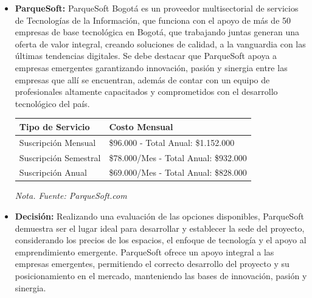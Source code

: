 \begin{itemize}
    \item \textbf{ParqueSoft:} ParqueSoft Bogotá es un proveedor multisectorial de servicios de Tecnologías de la Información, que funciona con el apoyo de más de 50 empresas de base tecnológica en Bogotá, que trabajando juntas generan una oferta de valor integral, creando soluciones de calidad, a la vanguardia con las últimas tendencias digitales. Se debe destacar que ParqueSoft apoya a empresas emergentes garantizando innovación, pasión y sinergia entre las empresas que allí se encuentran, además de contar con un equipo de profesionales altamente capacitados y comprometidos con el desarrollo tecnológico del país.

\begin{adjustbox}{center, caption={Precios de Espacios en ParqueSoft}, label={ParqueSoftPrecios}, nofloat=table, vspace={20px}}
    \begin{threeparttable}
        \centering
        \begin{tabular}{|p{7cm}|p{8cm}|}
            \hline
            \cellcolor[HTML]{D9EAD3}\textbf{Tipo de Servicio} & \cellcolor[HTML]{D9EAD3}\textbf{Costo Mensual} \\ \hline
            Suscripción Mensual   & \$96.000 - Total Anual: \$1.152.000 \\ \hline
            Suscripción Semestral & \$78.000/Mes - Total Anual: \$932.000 \\ \hline
            Suscripción Anual     & \$69.000/Mes - Total Anual: \$828.000 \\ \hline
        \end{tabular}
        \begin{tablenotes}
            \vspace{2mm}
            \textit{Nota. Fuente: ParqueSoft.com}
        \end{tablenotes}
    \end{threeparttable}
\end{adjustbox}

\item \textbf{Decisión:} Realizando una evaluación de las opciones disponibles, ParqueSoft demuestra ser el lugar ideal para desarrollar y establecer la sede del proyecto, considerando los precios de los espacios, el enfoque de tecnología y el apoyo al emprendimiento emergente. ParqueSoft ofrece un apoyo integral a las empresas emergentes, permitiendo el correcto desarrollo del proyecto y su posicionamiento en el mercado, manteniendo las bases de innovación, pasión y sinergia.
\end{itemize}


